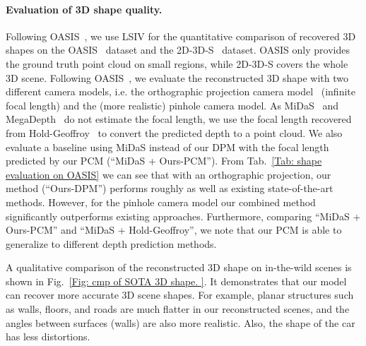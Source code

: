\paragraph{Evaluation of 3D shape quality.}
Following OASIS~\cite{chen2020oasis}, we use LSIV for the quantitative comparison of recovered 3D shapes on the OASIS~\cite{chen2020oasis} dataset and the 2D-3D-S~\cite{armeni2017joint} dataset. 
OASIS only provides the ground truth point cloud on small regions, while 2D-3D-S covers the whole 3D scene. Following OASIS~\cite{chen2020oasis}, we evaluate the reconstructed 3D shape with two different camera models, i.e. the orthographic projection camera model~\cite{chen2020oasis} (infinite focal length) and the (more realistic) pinhole camera model. 
As MiDaS~\cite{Ranftl2020} and MegaDepth~\cite{li2018megadepth} do not estimate the focal length, we use the focal length recovered from Hold-Geoffroy~\cite{hold2018perceptual} to convert the predicted depth to a point cloud.
We also evaluate a baseline using MiDaS instead of our DPM with the focal length predicted by our PCM (``MiDaS + Ours-PCM'').
From Tab.~\ref{Tab: shape evaluation on OASIS} we can see that with an orthographic projection, our method (``Ours-DPM'') performs  roughly as well as existing state-of-the-art methods. However, for the pinhole camera model our combined method significantly outperforms existing approaches. Furthermore, comparing ``MiDaS + Ours-PCM'' and ``MiDaS + Hold-Geoffroy'', we note that our PCM is able to generalize to different depth prediction methods. 

A qualitative comparison of the reconstructed 3D shape on in-the-wild scenes is shown in Fig.~\ref{Fig: cmp of SOTA 3D shape. }. 
It demonstrates that our model can recover more accurate 3D scene shapes. For example, planar structures such as walls, floors, and roads are much flatter in our reconstructed scenes, and the angles between surfaces (\eg walls) are also more realistic. Also, 
the shape of the car has less distortions.




